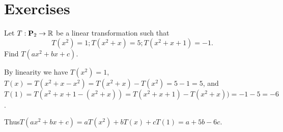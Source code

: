 \section*{Exercises}

\begin{ex}
  Let $T:\mathbf{P}_2 \to \mathbb{R}$ be a linear transformation such that
  \begin{equation*}
    T(x^2)=1; T(x^2+x)=5; T(x^2+x+1)=-1.
  \end{equation*}
  Find $T(ax^2+bx+c)$.
  \begin{sol}
    By linearity we have
    $T(x^2)=1$, $T(x) = T(x^2+x - x^2)= T(x^2+x) - T(x^2)= 5-1=5$, and
    $T(1) = T(x^2+x+1 -(x^2+x))=T(x^2+x+1) -T(x^2+x))= -1-5=-6$.

    Thus$T(ax^2+bx+c) = aT(x^2) + bT(x) + cT(1) = a+5b-6c$.
  \end{sol}
\end{ex}

